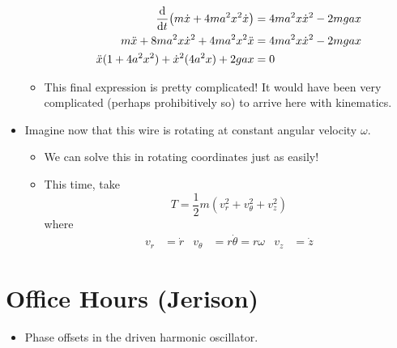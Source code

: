 \documentclass[../notes.tex]{subfiles}
\begin{document}
\begin{itemize}
\begin{itemize}
\begin{align*}
            \dv{t}(m\dot{x}+4ma^2x^2\dot{x}) &= 4ma^2x\dot{x}^2-2mgax\\
            m\ddot{x}+8ma^2x\dot{x}^2+4ma^2x^2\ddot{x} &= 4ma^2x\dot{x}^2-2mgax\\
            \ddot{x}(1+4a^2x^2)+\dot{x}^2(4a^2x)+2gax &= 0
        \end{align*}
        \item This final expression is pretty complicated! It would have been very complicated (perhaps prohibitively so) to arrive here with kinematics.
    \end{itemize}
    \item Imagine now that this wire is rotating at constant angular velocity $\omega$.
    \begin{itemize}
        \item We can solve this in rotating coordinates just as easily!
        \item This time, take
        \begin{equation*}
            T = \frac{1}{2}m(v_r^2+v_\theta^2+v_z^2)
        \end{equation*}
        where
        \begin{align*}
            v_r &= \dot{r}&
            v_\theta &= r\dot{\theta} = r\omega&
            v_z &= \dot{z}
        \end{align*}
    \end{itemize}
\end{itemize}



\section{Office Hours (Jerison)}
\begin{itemize}
    \item Phase offsets in the driven harmonic oscillator.
\end{itemize}
\end{document}
